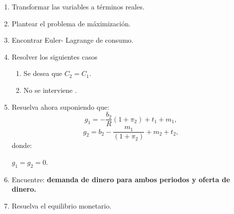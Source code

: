 \documentclass[a4paper,12pt]{article}
\begin{document}
\begin{enumerate}[label=\alph*)]
\item Transformar las variables a términos reales.
\item Plantear el problema de máximización. 
\item Encontrar Euler- Lagrange de consumo.
\item Resolver los siguientes casos
\begin{enumerate}[label=\alph*.\arabic*)]
        \item Se desea que $C_2=C_1$.
        \item No se interviene .
        \end{enumerate}
\item Resuelva ahora suponiendo que: 
\begin{equation*}
    g_1= - \frac{b_2}{R}(1+\pi_2) + t_1 + m_1,
\end{equation*}
\begin{equation*}
        g_2= b_2- \frac{m_1}{(1+\pi_2)}  + m_2 + t_2,
\end{equation*}
donde: 

$g_1=g_2=0$.

\item Encuentre: \textbf{demanda de dinero para ambos periodos y oferta de dinero.}
\item Resuelva el equilibrio monetario.
\end{enumerate}
\end{document}
